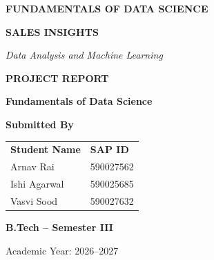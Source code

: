 \documentclass[12pt,a4paper]{report}
\begin{document}



\begin{titlepage}
    \centering

    \vspace*{0.5cm}


    \vspace{0.8cm}

    {\fontsize{20}{24}\selectfont
    \textbf{FUNDAMENTALS OF DATA SCIENCE}\par}

    \vspace{1.2cm}

    {\fontsize{34}{40}\selectfont
    \textbf{SALES INSIGHTS}\par}

    \vspace{0.5cm}

    {\fontsize{18}{23}\selectfont
    \textit{Data Analysis and Machine Learning}\par}

    \vspace{1.3cm}

    {\fontsize{24}{29}\selectfont
    \textbf{PROJECT REPORT}\par}

    \vspace{0.7cm}

    {\fontsize{18}{23}\selectfont
    \textbf{Fundamentals of Data Science}\par}

    \vspace{1.3cm}

    {\fontsize{20}{25}\selectfont
    \textbf{Submitted By}\par}

    \vspace{0.6cm}

    {\fontsize{16}{22}\selectfont
    \begin{tabular}{ll}
        \textbf{Student Name} &
        \textbf{SAP ID} \\[0.35cm]

        Arnav Rai & 590027562 \\[0.25cm]
        Ishi Agarwal & 590025685 \\[0.25cm]
        Vasvi Sood & 590027632
    \end{tabular}
    }

    \vfill

    {\fontsize{18}{23}\selectfont
    \textbf{B.Tech -- Semester III}\par}

    \vspace{0.5cm}

    {\fontsize{17}{22}\selectfont
    Academic Year: 2026--2027\par}

\end{titlepage}
\end{document}

